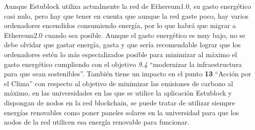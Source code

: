 Aunque Estublock utiliza actualmente la red de Ethereum1.0, su gasto energético casi nulo, pero hay que tener en cuenta que aunque la red gaste poco, hay varios ordenadores encendidos consumiendo energía, por lo que habrá que migrar a Ethereum2.0 cuando sea posible. Aunque el gasto energético es muy bajo, no se debe olvidar que gastar energía, gasta y que sería recomendable lograr que los ordenadores estén lo más especializados posible para minimizar al máximo el gasto energético cumpliendo con el objetivo \textit{9.4} ``modernizar la infraestructura para que sean sostenibles''. También tiene un impacto en el punto \textbf{13} ``Acción por el Clima'' con respecto al objetivo de minimizar las emisiones de carbono al máximo, en las universidades en las que se utilice la aplicación Estublock y dispongan de nodos en la red blockchain, se puede tratar de utilizar siempre energías renovables como poner paneles solares en la universidad para que los nodos de la red utilicen esa energía renovable para funcionar.

